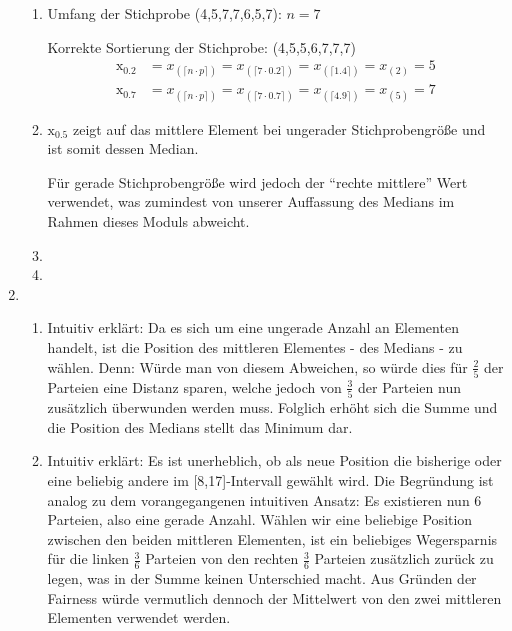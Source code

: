 \documentclass[a4paper]{scrartcl}
\def \blattnr {6}
\begin{document}
\begin{enumerate}[label=\bfseries \blattnr.\arabic*]
\begin{enumerate}
 \item
    Umfang der Stichprobe (4,5,7,7,6,5,7): $n=7$

    Korrekte Sortierung der Stichprobe: (4,5,5,6,7,7,7)
    \begin{align*}
        \text{\~{x}}_{\num{0.2}}
        &= x_{(\lceil n \cdot p \rceil)}
        = x_{(\lceil 7 \cdot 0.2 \rceil)}
        = x_{(\lceil 1.4 \rceil)}
        = x_{(2)} = 5 \\
        \text{\~{x}}_{0.7}
        &= x_{(\lceil n \cdot p \rceil)}
        = x_{(\lceil 7 \cdot 0.7 \rceil)}
        = x_{(\lceil 4.9 \rceil)}
        = x_{(5)} = 7
    \end{align*}

 \item
    $\text{\~{x}}_{0.5}$ zeigt auf das mittlere Element bei ungerader Stichprobengröße und ist somit dessen Median.
    
    Für gerade Stichprobengröße wird jedoch der ``rechte mittlere'' Wert verwendet, was zumindest von unserer Auffassung des 
    Medians im Rahmen dieses Moduls abweicht.
 \item 
 \item 
\end{enumerate}


\item 

\begin{enumerate}
 \item 
 Intuitiv erklärt: Da es sich um eine ungerade Anzahl an Elementen handelt, ist die Position des mittleren Elementes - des Medians - zu wählen.
 Denn: Würde man von diesem Abweichen, so würde dies für $\frac25$ der Parteien eine Distanz sparen, welche jedoch von $\frac35$ der Parteien 
 nun zusätzlich überwunden werden muss. Folglich erhöht sich die Summe und die Position des Medians stellt das Minimum dar.
 
 \item 
 Intuitiv erklärt: Es ist unerheblich, ob als neue Position die bisherige oder eine beliebig andere im [8,17]-Intervall gewählt wird. Die Begründung
 ist analog zu dem vorangegangenen intuitiven Ansatz: Es existieren nun 6 Parteien, also eine gerade Anzahl. 
 Wählen wir eine beliebige Position zwischen den beiden mittleren Elementen, ist ein beliebiges Wegersparnis für die linken $\frac36$ Parteien von den 
 rechten $\frac36$ Parteien zusätzlich zurück zu legen, was in der Summe keinen Unterschied macht. Aus Gründen der Fairness würde vermutlich dennoch der 
 Mittelwert von den zwei mittleren Elementen verwendet werden.
 
\end{enumerate}

\end{enumerate}
\end{document}
